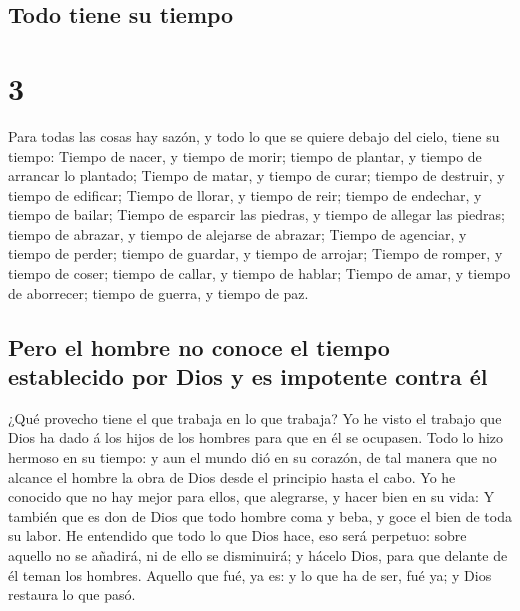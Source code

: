 \hypertarget{todo-tiene-su-tiempo}{%
\subsection{Todo tiene su tiempo}\label{todo-tiene-su-tiempo}}

\hypertarget{section-2}{%
\section{3}\label{section-2}}

 Para todas las cosas hay sazón, y todo lo que se quiere
debajo del cielo, tiene su tiempo:  Tiempo de nacer, y
tiempo de morir; tiempo de plantar, y tiempo de arrancar lo plantado;
 Tiempo de matar, y tiempo de curar; tiempo de destruir, y
tiempo de edificar;  Tiempo de llorar, y tiempo de reir;
tiempo de endechar, y tiempo de bailar;  Tiempo de
esparcir las piedras, y tiempo de allegar las piedras; tiempo de
abrazar, y tiempo de alejarse de abrazar;  Tiempo de
agenciar, y tiempo de perder; tiempo de guardar, y tiempo de arrojar;
 Tiempo de romper, y tiempo de coser; tiempo de callar, y
tiempo de hablar;  Tiempo de amar, y tiempo de aborrecer;
tiempo de guerra, y tiempo de paz.

\hypertarget{pero-el-hombre-no-conoce-el-tiempo-establecido-por-dios-y-es-impotente-contra-uxe9l}{%
\subsection{Pero el hombre no conoce el tiempo establecido por Dios y es
impotente contra
él}\label{pero-el-hombre-no-conoce-el-tiempo-establecido-por-dios-y-es-impotente-contra-uxe9l}}

 ¿Qué provecho tiene el que trabaja en lo que trabaja?
 Yo he visto el trabajo que Dios ha dado á los hijos de
los hombres para que en él se ocupasen.  Todo lo hizo
hermoso en su tiempo: y aun el mundo dió en su corazón, de tal manera
que no alcance el hombre la obra de Dios desde el principio hasta el
cabo.  Yo he conocido que no hay mejor para ellos, que
alegrarse, y hacer bien en su vida:  Y también que es don
de Dios que todo hombre coma y beba, y goce el bien de toda su labor.
 He entendido que todo lo que Dios hace, eso será
perpetuo: sobre aquello no se añadirá, ni de ello se disminuirá; y
hácelo Dios, para que delante de él teman los hombres. 
Aquello que fué, ya es: y lo que ha de ser, fué ya; y Dios restaura lo
que pasó.

